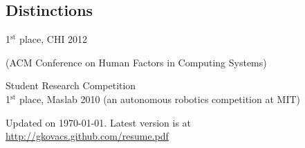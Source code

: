 \documentclass[margin,line]{resume}
\begin{document}
\begin{resume}
\section{\mysidestyle Distinctions}

1$^{\textrm{st}}$ place, CHI 2012 \begin{small}(ACM Conference on Human Factors in Computing Systems)\end{small} Student Research Competition\\
1$^{\textrm{st}}$ place, Maslab 2010 (an autonomous robotics competition at MIT)

\vspace{-3mm}

\begin{small}
\begin{center}
Updated on \today. Latest version is at \url{http://gkovacs.github.com/resume.pdf}
\end{center}
\end{small}

\end{resume}
\end{document}
